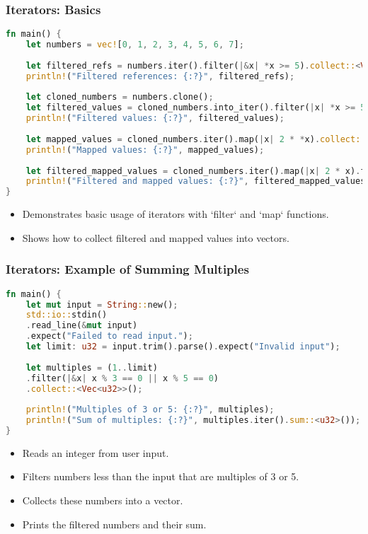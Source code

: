 \documentclass[aspectratio=169, table]{beamer}
\begin{document}
\begin{frame}[fragile]
\frametitle{Iterators: Basics}
\begin{lstlisting}[language=Rust]
fn main() {
	let numbers = vec![0, 1, 2, 3, 4, 5, 6, 7];
	
	let filtered_refs = numbers.iter().filter(|&x| *x >= 5).collect::<Vec<&u32>>();
	println!("Filtered references: {:?}", filtered_refs);
	
	let cloned_numbers = numbers.clone();
	let filtered_values = cloned_numbers.into_iter().filter(|x| *x >= 5).collect::<Vec<u32>>();
	println!("Filtered values: {:?}", filtered_values);
	
	let mapped_values = cloned_numbers.iter().map(|x| 2 * *x).collect::<Vec<u32>>();
	println!("Mapped values: {:?}", mapped_values);
	
	let filtered_mapped_values = cloned_numbers.iter().map(|x| 2 * x).filter(|x| *x > 10).collect::<Vec<u32>>();
	println!("Filtered and mapped values: {:?}", filtered_mapped_values);
}
\end{lstlisting}
\begin{itemize}
\item Demonstrates basic usage of iterators with `filter` and `map` functions.
\item Shows how to collect filtered and mapped values into vectors.
\end{itemize}
\end{frame}

\begin{frame}[fragile]
\frametitle{Iterators: Example of Summing Multiples}
\begin{lstlisting}[language=Rust]
fn main() {
	let mut input = String::new();
	std::io::stdin()
	.read_line(&mut input)
	.expect("Failed to read input.");
	let limit: u32 = input.trim().parse().expect("Invalid input");
	
	let multiples = (1..limit)
	.filter(|&x| x % 3 == 0 || x % 5 == 0)
	.collect::<Vec<u32>>();
	
	println!("Multiples of 3 or 5: {:?}", multiples);
	println!("Sum of multiples: {:?}", multiples.iter().sum::<u32>());
}
\end{lstlisting}
\begin{itemize}
\item Reads an integer from user input.
\item Filters numbers less than the input that are multiples of 3 or 5.
\item Collects these numbers into a vector.
\item Prints the filtered numbers and their sum.
\end{itemize}
\end{frame}
\end{document}
